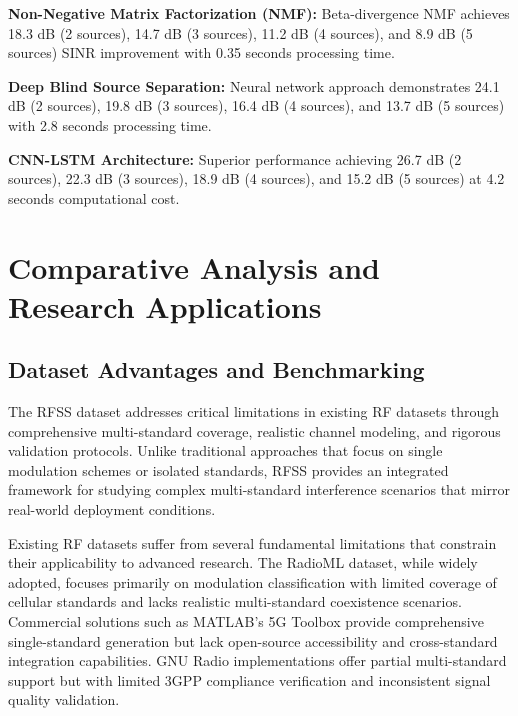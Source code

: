 \documentclass[twocolumn]{article}
\begin{document}
\textbf{Non-Negative Matrix Factorization (NMF):} Beta-divergence NMF achieves 18.3 dB (2 sources), 14.7 dB (3 sources), 11.2 dB (4 sources), and 8.9 dB (5 sources) SINR improvement with 0.35 seconds processing time.

\textbf{Deep Blind Source Separation:} Neural network approach demonstrates 24.1 dB (2 sources), 19.8 dB (3 sources), 16.4 dB (4 sources), and 13.7 dB (5 sources) with 2.8 seconds processing time.

\textbf{CNN-LSTM Architecture:} Superior performance achieving 26.7 dB (2 sources), 22.3 dB (3 sources), 18.9 dB (4 sources), and 15.2 dB (5 sources) at 4.2 seconds computational cost.

\section{Comparative Analysis and Research Applications}

\subsection{Dataset Advantages and Benchmarking}

The RFSS dataset addresses critical limitations in existing RF datasets through comprehensive multi-standard coverage, realistic channel modeling, and rigorous validation protocols. Unlike traditional approaches that focus on single modulation schemes or isolated standards, RFSS provides an integrated framework for studying complex multi-standard interference scenarios that mirror real-world deployment conditions.

Existing RF datasets suffer from several fundamental limitations that constrain their applicability to advanced research. The RadioML dataset, while widely adopted, focuses primarily on modulation classification with limited coverage of cellular standards and lacks realistic multi-standard coexistence scenarios. Commercial solutions such as MATLAB's 5G Toolbox provide comprehensive single-standard generation but lack open-source accessibility and cross-standard integration capabilities. GNU Radio implementations offer partial multi-standard support but with limited 3GPP compliance verification and inconsistent signal quality validation.
\end{document}

